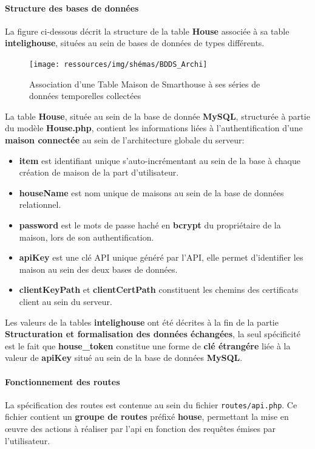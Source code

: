 \documentclass[10pt, a4paper]{report}
\begin{document}
	\paragraph{Structure des bases de données} La figure ci-dessous décrit la structure de la table \textbf{House} associée à sa table \textbf{intelighouse}, situées au sein de bases de données de types différents.
		\begin{figure}[h!]
			\centering
			\texttt{[image: ressources/img/shémas/BDDS\_Archi]}
			\caption{Association d'une Table Maison de Smarthouse à ses séries de données temporelles collectées}
		\label{fig:archBDDs}
		\end{figure}
		
		La table \textbf{House}, située au sein de la base de donnée \textbf{MySQL}, structurée à partie du modèle \textbf{House.php}, contient les informations liées à l'authentification d'une \textbf{maison connectée} au sein de l'architecture globale du serveur:
		\begin{itemize}
			\item \textbf{item} est identifiant unique s'auto-incrémentant au sein de la base à chaque création de maison de la part d'utilisateur.
			\item \textbf{houseName} est nom unique de maisons au sein de la base de données relationnel.
			\item \textbf{password} est le mots de passe haché en \textbf{bcrypt} du propriétaire de la maison, lors de son authentification.
			\item \textbf{apiKey} est une clé API unique généré par l'API, elle permet d'identifier les maison au sein des deux bases de données. 
			\item \textbf{clientKeyPath} et \textbf{clientCertPath} constituent les chemins des certificats client au sein du serveur.
		\end{itemize}
		
		Les valeurs de la tables \textbf{intelighouse} ont été décrites à la fin de la partie \textbf{Structuration et formalisation des données échangées}, la seul spécificité est le fait que \textbf{house\_token} constitue une forme de \textbf{clé étrangére} liée à la valeur de \textbf{apiKey} situé au sein de la base de données \textbf{MySQL}.
		
	\paragraph{Fonctionnement des routes\\}
	La spécification des routes est contenue au sein du fichier \texttt{routes/api.php}. Ce fichier contient un \textbf{groupe de routes} préfixé \textbf{house}, permettant la mise en œuvre des actions à réaliser par l'api en fonction des requêtes émises par l'utilisateur.
	
\end{document}
